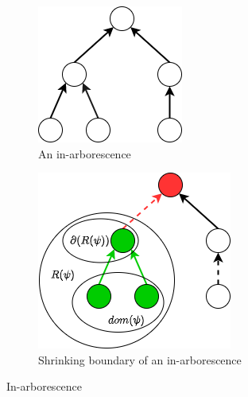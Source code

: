 \begin{figure}[ht]
\centering
\begin{subfigure}{0.4\textwidth}
    \includegraphics[width=0.8\linewidth]{GSSI_thesisProposal/figures/ina-2.png}
    \caption{An in-arborescence}
    \label{fig:ina}
\end{subfigure}
\hfill
\begin{subfigure}{0.4\textwidth}
    \includegraphics[width=0.8\linewidth]{GSSI_thesisProposal/figures/ina-1.png}
    \caption{Shrinking boundary of an in-arborescence}
    \label{fig:boundary}
\end{subfigure}
\caption{In-arborescence 
}
\label{fig:inar}
\end{figure}


